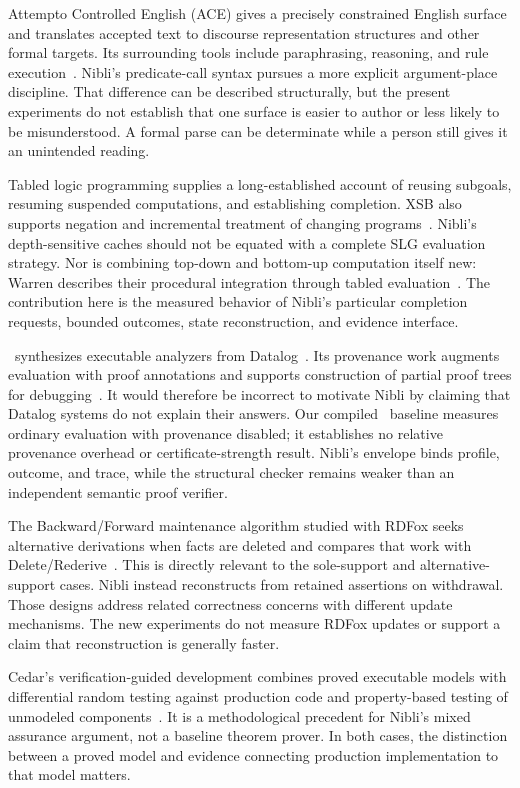 Attempto Controlled English (ACE) gives a precisely constrained English surface
and translates accepted text to discourse representation structures and other
formal targets. Its surrounding tools include paraphrasing, reasoning, and rule
execution~\cite{ace}. Nibli's predicate-call syntax pursues a more explicit
argument-place discipline. That difference can be described structurally, but
the present experiments do not establish that one surface is easier to author
or less likely to be misunderstood. A formal parse can be determinate while a
person still gives it an unintended reading.

Tabled logic programming supplies a long-established account of reusing subgoals,
resuming suspended computations, and establishing completion. XSB also supports
negation and incremental treatment of changing programs~\cite{xsb}.
Nibli's depth-sensitive caches should not be equated with a complete SLG
evaluation strategy. Nor is combining top-down and bottom-up computation itself
new: Warren describes their procedural integration through tabled
evaluation~\cite{topdown-bottomup}. The contribution here is the measured behavior
of Nibli's particular completion requests, bounded outcomes, state reconstruction,
and evidence interface.

\Souffle\ synthesizes executable analyzers from Datalog~\cite{souffle}.
Its provenance work augments evaluation with proof annotations and supports
construction of partial proof trees for debugging~\cite{souffle-provenance}.
It would therefore be incorrect to motivate Nibli by claiming that Datalog
systems do not explain their answers. Our compiled \Souffle\ baseline measures
ordinary evaluation with provenance disabled; it establishes no relative
provenance overhead or certificate-strength result. Nibli's envelope binds
profile, outcome, and trace, while the structural checker remains weaker than
an independent semantic proof verifier.

The Backward/Forward maintenance algorithm studied with RDFox seeks alternative
derivations when facts are deleted and compares that work with
Delete/Rederive~\cite{rdfox-bf}. This is directly relevant to the sole-support
and alternative-support cases. Nibli instead reconstructs from retained
assertions on withdrawal. Those designs address related correctness concerns
with different update mechanisms. The new experiments do not measure RDFox
updates or support a claim that reconstruction is generally faster.

Cedar's verification-guided development combines proved executable models with
differential random testing against production code and property-based testing
of unmodeled components~\cite{cedar}. It is a methodological precedent for
Nibli's mixed assurance argument, not a baseline theorem prover. In both cases,
the distinction between a proved model and evidence connecting production
implementation to that model matters.

